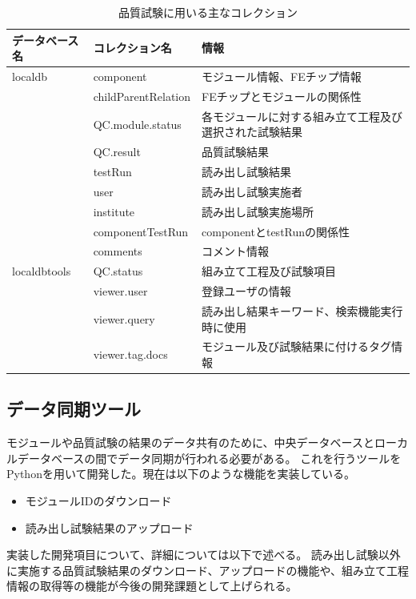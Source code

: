 \begin{table}[tbp]
\begin{center}
\caption[品質試験に用いる主なコレクション]{品質試験に用いる主なコレクション}
\label{localdb_structure}
  \begin{tabular}{|lll|} \hline
    データベース名 & コレクション名 & 情報 \\ \hline
    localdb      & component & モジュール情報、FEチップ情報 \\ 
                 & childParentRelation & FEチップとモジュールの関係性 \\ 
                 & QC.module.status & 各モジュールに対する組み立て工程及び選択された試験結果 \\ 
                 & QC.result & 品質試験結果 \\ 
                 & testRun & 読み出し試験結果 \\ 
                 & user & 読み出し試験実施者 \\
                 & institute & 読み出し試験実施場所 \\
                 & componentTestRun & componentとtestRunの関係性 \\ \hline
                 & comments & コメント情報 \\ \hline
    localdbtools & QC.status & 組み立て工程及び試験項目\\
                 & viewer.user & 登録ユーザの情報 \\
                 & viewer.query & 読み出し結果キーワード、検索機能実行時に使用 \\ 
                 & viewer.tag.docs & モジュール及び試験結果に付けるタグ情報 \\ \hline
  \end{tabular}
\end{center}
\end{table}

\subsection{データ同期ツール}
モジュールや品質試験の結果のデータ共有のために、中央データベースとローカルデータベースの間でデータ同期が行われる必要がある。
これを行うツールをPythonを用いて開発した。現在は以下のような機能を実装している。
\begin{itemize}
  \item モジュールIDのダウンロード
  \item 読み出し試験結果のアップロード
\end{itemize}
実装した開発項目について、詳細については以下で述べる。
読み出し試験以外に実施する品質試験結果のダウンロード、アップロードの機能や、組み立て工程情報の取得等の機能が今後の開発課題として上げられる。

